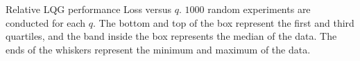 {Relative LQG performance Loss versus $q$. $1000$ random experiments are conducted for each $q$. The bottom and top of the box represent the first and third quartiles, and the band inside the box represents the median of the data. The ends of the whiskers represent the minimum and maximum of the data.}
  \label{fig:lqgloss}